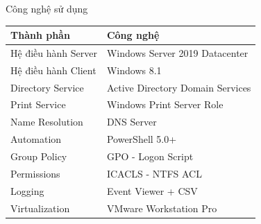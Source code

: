 \documentclass{beamer}
\begin{document}
    \begin{frame}{Công nghệ sử dụng}
        \begin{table}[ht]
            \centering
            \small
            \begin{tabular}{|l|l|}
            \hline
            \textbf{Thành phần} & \textbf{Công nghệ} \\
            \hline
            Hệ điều hành Server & Windows Server 2019 Datacenter \\
            \hline
            Hệ điều hành Client & Windows 8.1 \\
            \hline
            Directory Service & Active Directory Domain Services \\
            \hline
            Print Service & Windows Print Server Role \\
            \hline
            Name Resolution & DNS Server \\
            \hline
            Automation & PowerShell 5.0+ \\
            \hline
            Group Policy & GPO - Logon Script \\
            \hline
            Permissions & ICACLS - NTFS ACL \\
            \hline
            Logging & Event Viewer + CSV \\
            \hline
            Virtualization & VMware Workstation Pro \\
            \hline
            \end{tabular}
        \end{table}
    \end{frame}
\end{document}
